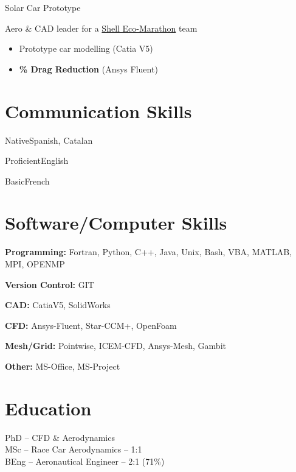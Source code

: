 \documentclass[fontsize=10pt]{tccv}
\begin{document}
\begin{eventlist}
     {Solar Car Prototype}

Aero \& CAD leader for a
\href{http://www.shell.com/global/environment-society/ecomarathon.html}{Shell
Eco-Marathon} team
\begin{itemize}
\itemsep -2pt
	\item Prototype car modelling (Catia V5)
	\item \textbf{\% Drag Reduction} (Ansys Fluent)
\end{itemize}
\end{eventlist}

\vspace{-20pt}
\section{Communication Skills}
\begin{factlist}
\item{Native}{Spanish, Catalan}
\item{Proficient}{English}
\item{Basic}{French}
\end{factlist}

\vspace{-20pt}
\section{Software/Computer Skills}
\begin{factlist}
\item{\textbf{Programming:}}
     {Fortran, Python, C++, Java, Unix, Bash, VBA, MATLAB, MPI, OPENMP}
\item{\textbf{Version Control:}}
     {GIT}
\item{\textbf{CAD:}}
     {CatiaV5, SolidWorks}
\item{\textbf{CFD:}}
     {Ansys-Fluent, Star-CCM+, OpenFoam}
\item{\textbf{Mesh/Grid:}}
     {Pointwise, ICEM-CFD, Ansys-Mesh, Gambit}
\item{\textbf{Other:}}
     {MS-Office, MS-Project}
\end{factlist}


\vspace{-20pt}
\section{Education}
\begin{eventlist}
     	{\normalsize{PhD -- CFD \& Aerodynamics}} \\

\vspace{-8pt}
     	{\normalsize{MSc -- Race Car Aerodynamics -- 1:1}} \\

\vspace{-8pt}
	{\normalsize{BEng -- Aeronautical Engineer -- 2:1 (71\%)}}
\end{eventlist}
\end{document}
